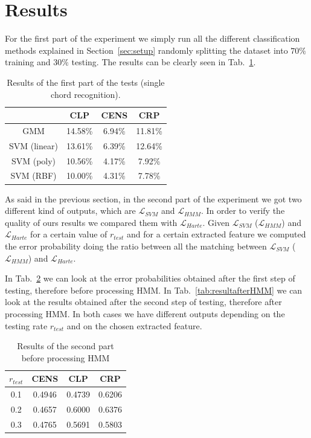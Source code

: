 \section{Results}
\label{sec:results}

For the first part of the experiment we simply run all the different classification methods explained in Section~\ref{sec:setup} randomly splitting the dataset into $70\%$ training and $30\%$ testing. The results can be clearly seen in Tab.~\ref{tab:singleChordResults}.

\begin{table}[t]
\centering
\begin{tabular}{|c|c|c|c|}
	\hline
	& CLP & CENS & CRP \\
	\hline
	GMM & 14.58\% & 6.94\% & 11.81\% \\
	\hline
	SVM (linear) & 13.61\% & 6.39\% & 12.64\% \\
	\hline
	SVM (poly) & 10.56\% & 4.17\% & 7.92\% \\
	\hline
	SVM (RBF) & 10.00\% & 4.31\% & 7.78\% \\
	\hline
\end{tabular}
\caption{Results of the first part of the tests (single chord recognition).}
\label{tab:singleChordResults}
\end{table}


As said in the previous section, in the second part of the experiment we got two different kind of outputs, which are $\mathcal{L}_{SVM}$ and $\mathcal{L}_{HMM}$. In order to verify the quality of ours results we compared them with  $\mathcal{L}_{Harte}$. Given $\mathcal{L}_{SVM}$ ($\mathcal{L}_{HMM}$) and $\mathcal{L}_{Harte}$ for a certain value of $r_{test}$ and for a certain extracted feature we computed the error probability doing the ratio between all the matching between $\mathcal{L}_{SVM}$ ($\mathcal{L}_{HMM}$) and $\mathcal{L}_{Harte}$.

 In Tab.~\ref{tab:resultbeforeHMM} we can look at the error probabilities obtained after the first step of testing, therefore before processing HMM. In Tab.~\ref{tab:resultafterHMM} we can look at the results obtained after the second step of testing, therefore after processing HMM. In both cases we have different outputs depending on the testing rate $r_{test}$ and on the chosen extracted feature.

\begin{table}[h!]
	\caption{Results of the second part before processing HMM}
	\centering
	\begin{tabular}{|c |c c c|}
	\hline
	$r_{test}$ & CENS & CLP & CRP\\ \hline
	0.1 & 0.4946 & 0.4739 & 0.6206\\
	0.2 & 0.4657 & 0.6000 & 0.6376\\
	0.3 & 0.4765 & 0.5691 & 0.5803\\
	\hline
	\end{tabular}
	\label{tab:resultbeforeHMM}
\end{table}

